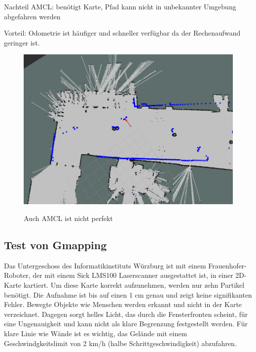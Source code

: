 \documentclass[11pt,a4paper]{article}
\begin{document}
{Nachteil AMCL: benötigt Karte, Pfad kann nicht in unbekannter Umgebung abgefahren werden

Vorteil: Odometrie ist h\"aufiger und schneller verf\"ugbar da der Rechenaufwand geringer ist. 

\begin{figure}[h]
	\centering
	{\includegraphics[width=\linewidth]{pictures/amcl_fail.png}}
	\caption{ Auch AMCL ist nicht perfekt \label{fig:amclFails}}
\end{figure}




\subsection{Test von Gmapping}
{
	Das Untergeschoss des Informatikinstituts W\"urzburg ist mit einem Frauenhofer-Roboter, der mit einem Sick LMS100 Laserscanner ausgestattet ist, in einer 2D-Karte kartiert.  Um diese Karte korrekt aufzunehmen, werden nur zehn Partikel ben\"otigt. Die Aufnahme ist bis auf einen 1 cm genau und zeigt keine signifikanten Fehler. Bewegte Objekte wie Menschen werden erkannt und nicht in der Karte verzeichnet. Dagegen sorgt helles Licht, das durch die Fensterfronten scheint, f\"ur eine Ungenauigkeit und kann nicht als klare Begrenzung festgestellt werden. F\"ur klare Linie wie W\"ande ist es wichtig, das Gel\"ande mit einem Geschwindgkeitslimit von 2 km/h (halbe Schrittgeschwindigkeit) abzufahren.  
	
}}
\end{document}
